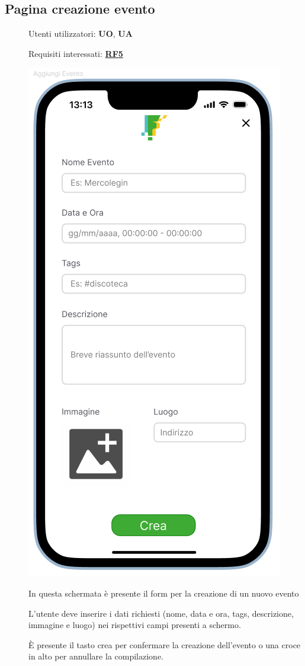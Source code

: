 \documentclass{article}
\begin{document}
\subsection{Pagina creazione evento}
\begin{description}
    \item[] Utenti utilizzatori: \textbf{UO}, \textbf{UA}
    \item[] Requisiti interessati: \hyperref[rf_5]{\textbf{RF5}}
    \item[] \begin{center}
            \includegraphics[scale=0.6]{Aggiungi_Evento.png}
        \end{center}
    \item[] In questa schermata è presente il form per la creazione di un nuovo evento
    \item[] L'utente deve inserire i dati richiesti (nome, data e ora, tags, descrizione, immagine e luogo) nei rispettivi campi presenti a schermo.
    \item[] È presente il tasto crea per confermare la creazione dell'evento o una croce in alto per annullare la compilazione.
\end{description}
\clearpage
\end{document}
